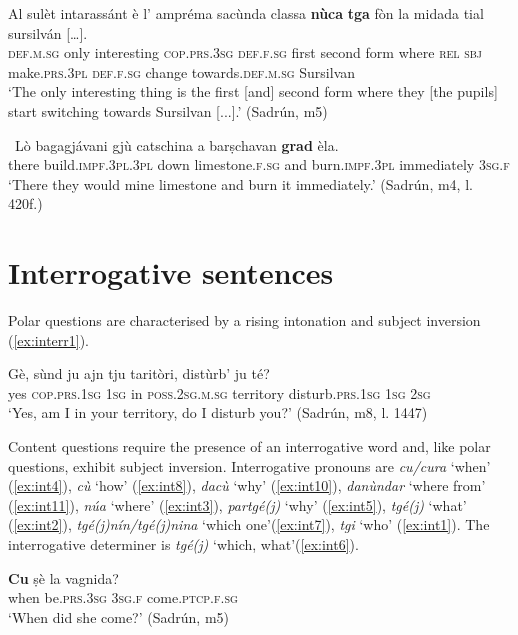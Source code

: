 \ea
\label{ex:nosubj2}
 \gll    Al sulèt intarassánt è l’ ampréma sacùnda classa \textbf{nùca} \textbf{tga} \longrule {} fòn la midada tial sursilván […].\\
 \textsc{def.m.sg} only interesting \textsc{cop.prs.3sg} \textsc{def.f.sg} first second form where \textsc{rel} \textsc{sbj} make.\textsc{prs.3pl} \textsc{def.f.sg} change towards.\textsc{def.m.sg} Sursilvan\\
 \glt `The only interesting thing is the first [and] second form where they [the pupils] start switching towards Sursilvan [...].' (Sadrún, m5)
 \z
 
 
 \ea
 \
 \gll Lò bagagjávani gjù catschina a barṣchavan \textbf{grad} èla.   \\
 there build.\textsc{impf.3pl.3pl} down limestone.\textsc{f.sg} and  burn.\textsc{impf.3pl} immediately \textsc{3sg.f}\\
\glt `There they would mine limestone and burn it immediately.' (Sadrún, m4, l. 420f.)
\z
 
 

\section{Interrogative sentences}
Polar questions are characterised by a rising intonation and subject inversion (\ref{ex:interr1}).

\ea
\label{ex:interr1}
\gll Gè, sùnd ju ajn tju taritòri, distùrb’ ju té?   \\
yes \textsc{cop.prs.1sg} \textsc{1sg} in \textsc{poss.2sg.m.sg} territory disturb.\textsc{prs.1sg} \textsc{1sg} \textsc{2sg} \\
\glt `Yes, am I in your territory, do I disturb you?' (Sadrún, m8, l. 1447)
\z

Content questions require the presence of an interrogative word and, like polar questions, exhibit subject inversion. Interrogative pronouns are \textit{cu/cura} `when' (\ref{ex:int4}), \textit{cù} `how' (\ref{ex:int8}), \textit{dacù} `why' (\ref{ex:int10}), \textit{danùndar} `where from' (\ref{ex:int11}), \textit{núa} `where' (\ref{ex:int3}), \textit{partgé(j)} `why' (\ref{ex:int5}), \textit{tgé(j)} `what' (\ref{ex:int2}), \textit{tgé(j)nín/tgé(j)nina} `which one'(\ref{ex:int7}), \textit{tgi} `who' (\ref{ex:int1}). The interrogative determiner is \textit{tgé(j)} `which, what'(\ref{ex:int6}).

\ea
\label{ex:int4}
\gll \textbf{Cu} ṣè la vagnida?\\
when be.\textsc{prs.3sg} \textsc{3sg.f} come.\textsc{ptcp.f.sg}\\
\glt `When did she come?' (Sadrún, m5)
\z

